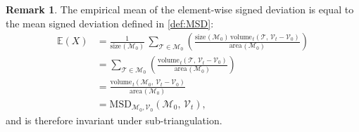 \documentclass{article}
\theoremstyle{definition}
\newtheorem{remark}{Remark}
\newcommand{\EE}{\mathbb{E}}
\newcommand{\MM}{\mathcal{M}}
\newcommand{\VV}{\mathcal{V}}
\newcommand{\TT}{\mathcal{T}}
\newcommand{\area}{\mathrm{area}\hspace{1pt}}
\newcommand{\size}{\mathrm{size}\hspace{1pt}}
\newcommand{\vol}{\mathrm{volume\hspace{1pt}}}
\begin{document}
\begin{remark}
The empirical mean of the element-wise signed deviation is equal to the mean signed deviation defined in
\ref{def:MSD}:
\begin{align*}
\EE(X) & = \frac{1}{\size(\MM_0)}\,\sum_{\TT\in\MM_0}
 \left(\frac{\size(\MM_0)\,\vol_t(\TT,\,\VV_t-\VV_0)}{\area(\MM_0)}\right) \\
 & = \sum_{\TT\in\MM_0}\left(\frac{\vol_t(\TT,\,\VV_t-\VV_0)}{\area(\MM_0)}\right) \\
 & = \frac{\vol_t(\MM_0,\,\VV_t-\VV_0)}{\area(\MM_0)}\\
 & = \mathrm{MSD}_{\MM_0,\VV_0} (\MM_0,\,\VV_t),
\end{align*}
and is therefore invariant under sub-triangulation.
\end{remark}


% 
% 
% 
\end{document}
